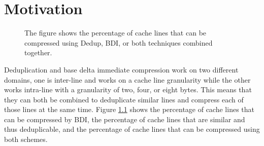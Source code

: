
\chapter{Motivation}
\label{ch:Motivation}
\begin{figure}
    \begin{subfigure}[t]{\textwidth}
    \end{subfigure}
    \begin{subfigure}[b]{\textwidth}
    \end{subfigure}
    \caption[Compressible lines]{The figure shows the percentage of cache lines that can be compressed using Dedup, BDI, or both techniques combined together.}
    \label{fig:CompPossibility}
\end{figure}
Deduplication and base delta immediate compression work on two different domains, one is inter-line and works on a cache line granularity while the other works intra-line with a granularity of two, four, or eight bytes. This means that they can both be combined to deduplicate similar lines and compress each of those lines at the same time. Figure \ref{fig:CompPossibility} shows the percentage of cache lines that can be compressed by BDI, the percentage of cache lines that are similar and thus deduplicable, and the percentage of cache lines that can be compressed using both schemes.\par
